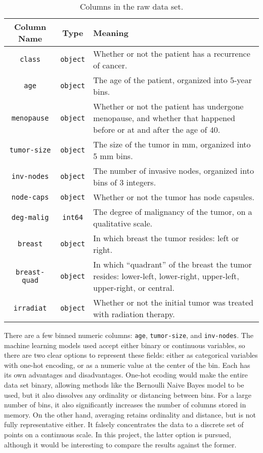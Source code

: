 \documentclass{article}
\begin{document}
\begin{table}
	\centering
	\caption{Columns in the raw data set.}
	\label{tbl:cols}
	\begin{tabular}{cc|p{3.5in}}
		Column Name & Type & Meaning \\
		\hline
		\verb|class| & \verb|object| & Whether or not the patient has a recurrence of cancer. \\
		\verb|age| & \verb|object| & The age of the patient, organized into 5-year bins. \\
		\verb|menopause| & \verb|object| & Whether or not the patient has undergone menopause, and whether that happened before or at and after the age of 40. \\
		\verb|tumor-size| & \verb|object| & The size of the tumor in mm, organized into 5 mm bins. \\
		\verb|inv-nodes| & \verb|object| & The number of invasive nodes, organized into bins of 3 integers. \\
		\verb|node-caps| & \verb|object| & Whether or not the tumor has node capsules. \\
		\verb|deg-malig| & \verb|int64| & The degree of malignancy of the tumor, on a qualitative scale. \\
		\verb|breast| & \verb|object| & In which breast the tumor resides: left or right. \\
		\verb|breast-quad| & \verb|object| & In which ``quadrant'' of the breast the tumor resides: lower-left, lower-right, upper-left, upper-right, or central. \\
		\verb|irradiat| & \verb|object| & Whether or not the initial tumor was treated with radiation therapy.
	\end{tabular}
\end{table}

There are a few binned numeric columns: \verb|age|, \verb|tumor-size|, and \verb|inv-nodes|. The machine learning models used accept either binary or continuous variables, so there are two clear options to represent these fields: either as categorical variables with one-hot encoding, or as a numeric value at the center of the bin. Each has its own advantages and disadvantages. One-hot ecoding would make the entire data set binary, allowing methods like the Bernoulli Naive Bayes model to be used, but it also dissolves any ordinality or distancing between bins. For a large number of bins, it also significantly increases the number of columns stored in memory. On the other hand, averaging retains ordinality and distance, but is not fully representative either. It falsely concentrates the data to a discrete set of points on a continuous scale. In this project, the latter option is pursued, although it would be interesting to compare the results against the former.
\end{document}
